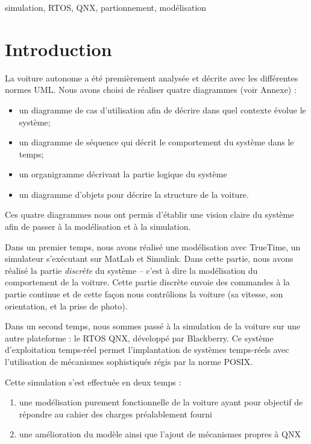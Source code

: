 \documentclass[conference]{IEEEtran}
\begin{document}
\begin{IEEEkeywords}
simulation, RTOS, QNX, partion\-nement, modé\-lisation
\end{IEEEkeywords}


\section{Introduction}

La voiture autonome a été premièrement analysée et décrite avec les différentes normes
UML. Nous avons choisi de réaliser quatre diagrammes (voir Annexe) :
\begin{itemize}
	\item un diagramme de cas d'utilisation afin de décrire dans quel contexte évolue le
		système;
	\item un diagramme de séquence qui décrit le comportement du système dans le temps;
	\item un organigramme décrivant la partie logique du système \item un diagramme
		d'objets pour décrire la structure de la voiture.
\end{itemize}{}
 
Ces quatre diagrammes nous ont permis d'établir une vision claire du système afin de
passer à la modélisation et à la simulation.

Dans un premier temps, nous avons réalisé une modélisation avec TrueTime, un simulateur
s'exécutant sur MatLab et Simulink. Dans cette partie, nous avons réalisé la partie
\emph{discrète} du système -- c'est à dire la modélisation du comportement de la voiture.
Cette partie discrète envoie des commandes à la partie continue et de cette façon nous
contrôlions la voiture (sa vitesse, son orientation, et la prise de photo).

Dans un second temps, nous sommes passé à la simulation de la voiture sur une autre
plateforme : le RTOS QNX, développé par Blackberry. Ce système d'exploitation temps-réel
permet l'implantation de systèmes temps-réels avec l'utilisation de mécanismes
sophistiqués régis par la norme POSIX.

Cette simulation s'est effectuée en deux temps :
\begin{enumerate}
	\item une modélisation purement fonctionnelle de la voiture ayant pour objectif de
		répondre au cahier des charges préalablement fourni
	\item une amélioration du modèle ainsi que l'ajout de méca\-nismes propres à QNX
\end{enumerate}
\end{document}
